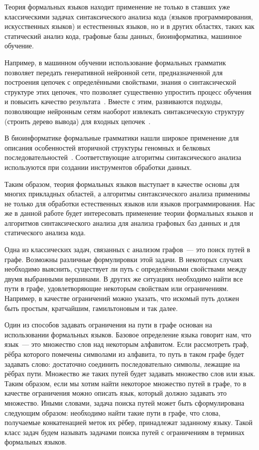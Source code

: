 
Теория формальных языков находит применение не только в ставших уже классическими задачах синтаксического анализа кода (языков программирования, искусственных языков) и естественных языков, но и в других областях, таких как статический анализ кода, графовые базы данных, биоинформатика, машинное обучение.

Например, в машинном обучении использование формальных грамматик позволяет передать генеративной нейронной сети, предназначенной для построения цепочек с определёнными свойствами, знания о синтаксической структуре этих цепочек, что позволяет существенно упростить процесс обучения и повысить качество результата~.
Вместе с этим, развиваются подходы, позволяющие нейронным сетям наоборот извлекать синтаксическую структуру (строить дерево вывода) для входных цепочек~.

В биоинформатике формальные грамматики нашли широкое применение для описания особенностей вторичной структуры геномных и белковых последовательностей~.
Соответствующие алгоритмы синтаксического анализа используются при создании инструментов обработки данных.

Таким образом, теория формальных языков выступает в качестве основы для многих прикладных областей, а алгоритмы синтаксического анализа применимы не только для обработки естественных языков или языков программирования.
Нас же в данной работе будет интересовать применение теории формальных языков и алгоритмов синтаксического анализа для анализа графовых баз данных и для статического анализа кода.

Одна из классических задач, связанных с анализом графов~--- это поиск путей в графе.
Возможны различные формулировки этой задачи.
В некоторых случаях необходимо выяснить, существует ли путь с определёнными свойствами между двумя выбранными вершинами.
В других же ситуациях необходимо найти все пути в графе, удовлетворяющие некоторым свойствам или ограничениям.
Например, в качестве ограничений можно указать, что искомый путь должен быть простым, кратчайшим, гамильтоновым и так далее.

Один из способов задавать ограничения на пути в графе основан на использовании формальных языков.
Базовое определение языка говорит нам, что язык~--- это множество слов над некоторым алфавитом.
Если рассмотреть граф, рёбра которого помечены символами из алфавита, то путь в таком графе будет задавать слово: достаточно соединить последовательно символы, лежащие на рёбрах пути.
Множество же таких путей будет задавать множество слов или язык.
Таким образом, если мы хотим найти некоторое множество путей в графе, то в качестве ограничения можно описать язык, который должно задавать это множество.
Иными словами, задача поиска путей может быть сформулирована следующим образом: необходимо найти такие пути в графе, что слова, получаемые конкатенацией меток их рёбер, принадлежат заданному языку.
Такой класс задач будем называть задачами поиска путей с ограничениям в терминах формальных языков.

